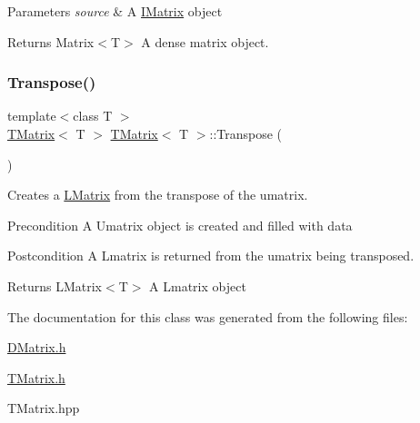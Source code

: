 \begin{DoxyParams}{Parameters}
{\em source} & A \mbox{\hyperlink{class_i_matrix}{I\+Matrix}} object \\
\hline
\end{DoxyParams}
\begin{DoxyReturn}{Returns}
Matrix$<$\+T$>$ A dense matrix object. 
\end{DoxyReturn}
\mbox{\label{class_t_matrix_a00c68321d71e62d641c711be9dd01b8a}} 
\subsubsection{\texorpdfstring{Transpose()}{Transpose()}}
{\footnotesize\ttfamily template$<$class T $>$ \\
\mbox{\hyperlink{class_t_matrix}{T\+Matrix}}$<$ T $>$ \mbox{\hyperlink{class_t_matrix}{T\+Matrix}}$<$ T $>$\+::Transpose (\begin{DoxyParamCaption}{ }\end{DoxyParamCaption})}



Creates a \mbox{\hyperlink{class_l_matrix}{L\+Matrix}} from the transpose of the umatrix. 

\begin{DoxyPrecond}{Precondition}
A Umatrix object is created and filled with data 
\end{DoxyPrecond}
\begin{DoxyPostcond}{Postcondition}
A Lmatrix is returned from the umatrix being transposed.
\end{DoxyPostcond}
\begin{DoxyReturn}{Returns}
L\+Matrix$<$\+T$>$ A Lmatrix object 
\end{DoxyReturn}


The documentation for this class was generated from the following files\+:\begin{DoxyCompactItemize}
\item 
\mbox{\hyperlink{_d_matrix_8h}{D\+Matrix.\+h}}\item 
\mbox{\hyperlink{_t_matrix_8h}{T\+Matrix.\+h}}\item 
T\+Matrix.\+hpp\end{DoxyCompactItemize}
